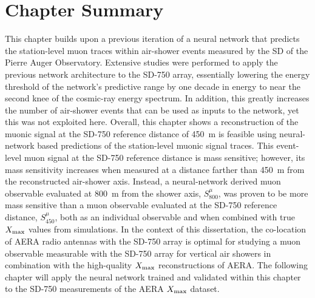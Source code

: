 \section{Chapter Summary}\label{sec:ch5_summary}
This chapter builds upon a previous iteration of a neural network that predicts the station-level muon traces within air-shower events measured by the SD of the Pierre Auger Observatory.
Extensive studies were performed to apply the previous network architecture to the SD-750 array, essentially lowering the energy threshold of the network's predictive range by one decade in energy to near the second knee of the cosmic-ray energy spectrum.
In addition, this greatly increases the number of air-shower events that can be used as inputs to the network, yet this was not exploited here.
Overall, this chapter shows a reconstruction of the muonic signal at the SD-750 reference distance of \qty{450}{\meter} is feasible using neural-network based predictions of the station-level muonic signal traces.
This event-level muon signal at the SD-750 reference distance is mass sensitive; however, its mass sensitivity increases when measured at a distance farther than \qty{450}{\meter} from the reconstructed air-shower axis.
Instead, a neural-network derived muon observable evaluated at \qty{800}{\meter} from the shower axis, $S^{\mu}_{800}$, was proven to be more mass sensitive than a muon observable evaluated at the SD-750 reference distance, $S^{\mu}_{450}$, both as an individual observable and when combined with true $X_{\rm max}$ values from simulations.
In the context of this dissertation, the co-location of AERA radio antennas with the SD-750 array is optimal for studying a muon observable measurable with the SD-750 array for vertical air showers in combination with the high-quality $X_{\rm max}$ reconstructions of AERA.
The following chapter will apply the neural network trained and validated within this chapter to the SD-750 measurements of the AERA $X_{\rm max}$ dataset.


